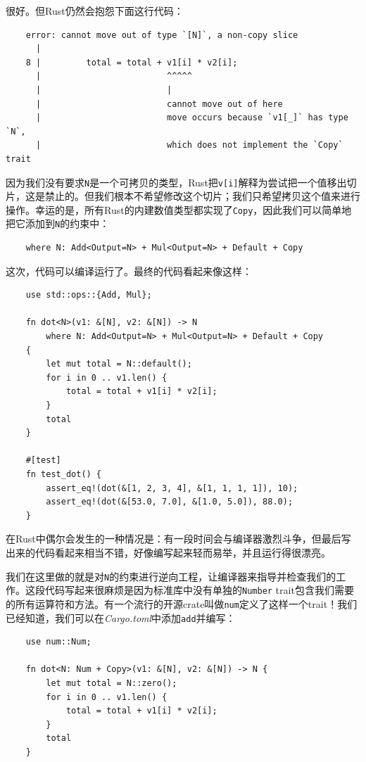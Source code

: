 很好。但Rust仍然会抱怨下面这行代码：
\begin{verbatim}
    error: cannot move out of type `[N]`, a non-copy slice
      |
    8 |         total = total + v1[i] * v2[i];
      |                         ^^^^^
      |                         |
      |                         cannot move out of here
      |                         move occurs because `v1[_]` has type `N`,
      |                         which does not implement the `Copy` trait
\end{verbatim}

因为我们没有要求\texttt{N}是一个可拷贝的类型，Rust把\texttt{v[i]}解释为尝试把一个值移出切片，这是禁止的。但我们根本不希望修改这个切片；我们只希望拷贝这个值来进行操作。幸运的是，所有Rust的内建数值类型都实现了\texttt{Copy}，因此我们可以简单地把它添加到\texttt{N}的约束中：
\begin{verbatim}
    where N: Add<Output=N> + Mul<Output=N> + Default + Copy
\end{verbatim}

这次，代码可以编译运行了。最终的代码看起来像这样：
\begin{verbatim}
    use std::ops::{Add, Mul};

    fn dot<N>(v1: &[N], v2: &[N]) -> N
        where N: Add<Output=N> + Mul<Output=N> + Default + Copy
    {
        let mut total = N::default();
        for i in 0 .. v1.len() {
            total = total + v1[i] * v2[i];
        }
        total
    }

    #[test]
    fn test_dot() {
        assert_eq!(dot(&[1, 2, 3, 4], &[1, 1, 1, 1]), 10);
        assert_eq!(dot(&[53.0, 7.0], &[1.0, 5.0]), 88.0);
    }
\end{verbatim}

在Rust中偶尔会发生的一种情况是：有一段时间会与编译器激烈斗争，但最后写出来的代码看起来相当不错，好像编写起来轻而易举，并且运行得很漂亮。 

我们在这里做的就是对\texttt{N}的约束进行逆向工程，让编译器来指导并检查我们的工作。这段代码写起来很麻烦是因为标准库中没有单独的\texttt{Number} trait包含我们需要的所有运算符和方法。有一个流行的开源crate叫做\texttt{num}定义了这样一个trait！我们已经知道，我们可以在\emph{Cargo.toml}中添加\texttt{add}并编写：
\begin{verbatim}
    use num::Num;

    fn dot<N: Num + Copy>(v1: &[N], v2: &[N]) -> N {
        let mut total = N::zero();
        for i in 0 .. v1.len() {
            total = total + v1[i] * v2[i];
        }
        total
    }
\end{verbatim}

